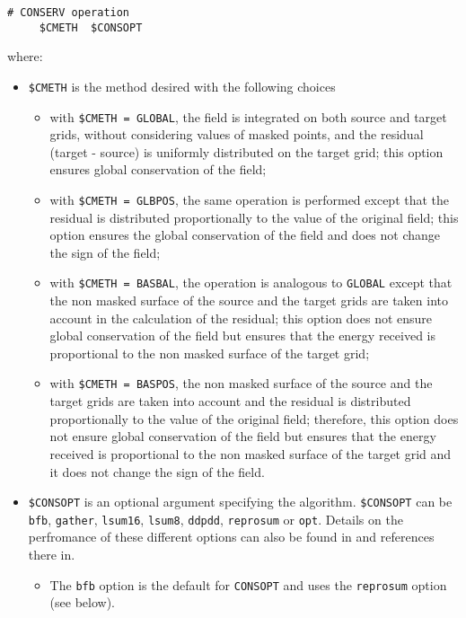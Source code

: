 \begin{itemize}
 \begin{verbatim}
# CONSERV operation
     $CMETH  $CONSOPT
\end{verbatim}
  \vspace{-0.5cm} where:
  \begin{itemize}
  \item {\tt \$CMETH} is the method desired with the following choices
    \begin{itemize}
    \item with {\tt \$CMETH = GLOBAL}, the field is integrated on both
      source and target grids, without considering values of masked
      points, and the residual (target - source) is uniformly
      distributed on the target grid; this option ensures global
      conservation of the field;
    \item with {\tt \$CMETH = GLBPOS}, the same operation is performed
      except that the residual is distributed proportionally to the
      value of the original field; this option ensures the global
      conservation of the field and does not change the sign of the
      field;
    \item with {\tt \$CMETH = BASBAL}, the operation is analogous to
      {\tt GLOBAL} except that the non masked surface of the source
      and the target grids are taken into account in the calculation
      of the residual; this option does not ensure global conservation
      of the field but ensures that the energy received is
      proportional to the non masked surface of the target grid;
    \item with {\tt \$CMETH = BASPOS}, the non masked surface of the
      source and the target grids are taken into account and the
      residual is distributed proportionally to the value of the
      original field; therefore, this option does not ensure global
      conservation of the field but ensures that the energy received
      is proportional to the non masked surface of the target grid and
      it does not change the sign of the field.
    \end{itemize}
  \item {\tt \$CONSOPT} is an optional argument specifying the
    algorithm.  {\tt \$CONSOPT} can be {\tt bfb}, {\tt gather}, {\tt lsum16}, {\tt lsum8},
    {\tt ddpdd}, {\tt reprosum} or {\tt opt}. Details on the perfromance of these different options can also be found in \cite{craig17} and references there in.
\begin{itemize}
\item The {\tt bfb} option is the default for {\tt CONSOPT}  and uses the {\tt reprosum} option (see below).

\end{itemize}
\end{itemize}
\end{itemize}
